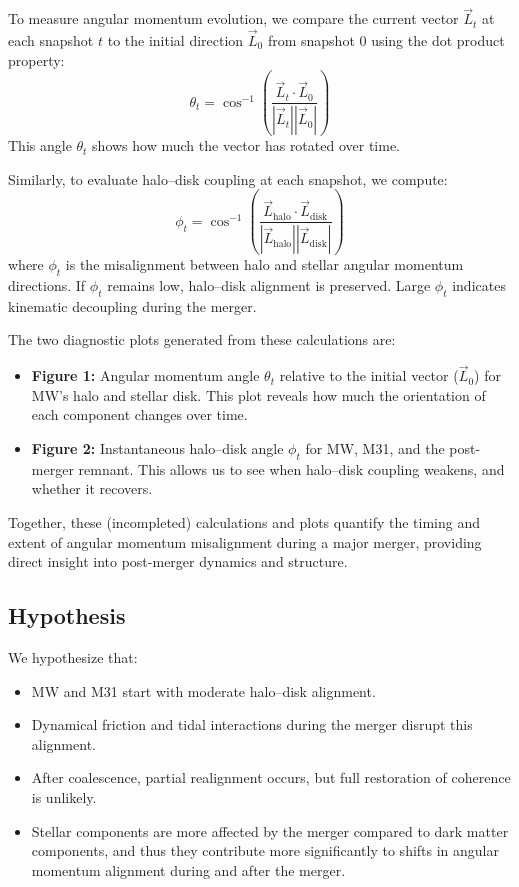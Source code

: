 \documentclass[twocolumn]{aastex631}
\begin{document}
To measure angular momentum evolution, we compare the current vector $\vec{L}_t$ at each snapshot $t$ to the initial direction $\vec{L}_0$ from snapshot 0 using the dot product property:
\[\theta_t = \cos^{-1}\left( \frac{ \vec{L}_t \cdot \vec{L}_0 }{ |\vec{L}_t||\vec{L}_0| } \right)\]
This angle $\theta_t$ shows how much the vector has rotated over time.

Similarly, to evaluate halo–disk coupling at each snapshot, we compute:
\[\phi_t = \cos^{-1}\left( \frac{ \vec{L}_\text{halo} \cdot \vec{L}_\text{disk} }{ |\vec{L}_\text{halo}||\vec{L}_\text{disk}| } \right)\]
where $\phi_t$ is the misalignment between halo and stellar angular momentum directions. If $\phi_t$ remains low, halo–disk alignment is preserved. Large $\phi_t$ indicates kinematic decoupling during the merger.

The two diagnostic plots generated from these calculations are:
\begin{itemize}
    \item \textbf{Figure 1:} Angular momentum angle $\theta_t$ relative to the initial vector ($\vec{L}_0$) for MW’s halo and stellar disk. This plot reveals how much the orientation of each component changes over time.
    \item \textbf{Figure 2:} Instantaneous halo–disk angle $\phi_t$ for MW, M31, and the post-merger remnant. This allows us to see when halo–disk coupling weakens, and whether it recovers.
\end{itemize}

Together, these (incompleted) calculations and plots quantify the timing and extent of angular momentum misalignment during a major merger, providing direct insight into post-merger dynamics and structure.

\subsection{Hypothesis}

We hypothesize that:
\begin{itemize}
    \item MW and M31 start with moderate halo–disk alignment.
    \item Dynamical friction and tidal interactions during the merger disrupt this alignment.
    \item After coalescence, partial realignment occurs, but full restoration of coherence is unlikely.
    \item Stellar components are more affected by the merger compared to dark matter components, and thus they contribute more significantly to shifts in angular momentum alignment during and after the merger.
\end{itemize}
\end{document}
